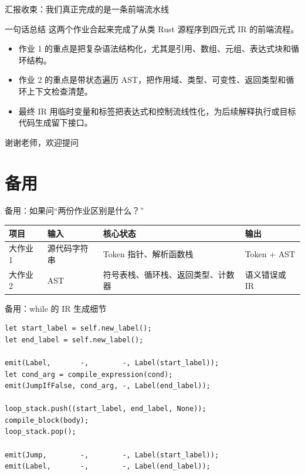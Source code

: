 \documentclass[aspectratio=169]{ctexbeamer}
\begin{document}
\begin{frame}{汇报收束：我们真正完成的是一条前端流水线}
    \begin{block}{一句话总结}
        这两个作业合起来完成了从类 Rust 源程序到四元式 IR 的前端流程。
    \end{block}
    \begin{itemize}
        \item 作业 1 的重点是把复杂语法结构化，尤其是引用、数组、元组、表达式块和循环结构。
        \item 作业 2 的重点是带状态遍历 AST，把作用域、类型、可变性、返回类型和循环上下文检查清楚。
        \item 最终 IR 用临时变量和标签把表达式和控制流线性化，为后续解释执行或目标代码生成留下接口。
    \end{itemize}
    \vfill
    \centering
    \Large 谢谢老师，欢迎提问
\end{frame}

\appendix
\section{备用}

\begin{frame}{备用：如果问“两份作业区别是什么？”}
    \begin{table}
    \centering
    \small
    \begin{tabular}{p{2.3cm}p{3.0cm}p{3.2cm}p{3.1cm}}
        \toprule
        \textbf{项目} & \textbf{输入} & \textbf{核心状态} & \textbf{输出} \\
        \midrule
        大作业 1 & 源代码字符串 & Token 指针、解析函数栈 & Token + AST \\
        大作业 2 & AST & 符号表栈、循环栈、返回类型、计数器 & 语义错误或 IR \\
        \bottomrule
    \end{tabular}
    \end{table}
\end{frame}

\begin{frame}[fragile]{备用：while 的 IR 生成细节}
    \begin{lstlisting}[style=tinycode]
let start_label = self.new_label();
let end_label = self.new_label();

emit(Label,       -,        -, Label(start_label));
let cond_arg = compile_expression(cond);
emit(JumpIfFalse, cond_arg, -, Label(end_label));

loop_stack.push((start_label, end_label, None));
compile_block(body);
loop_stack.pop();

emit(Jump,        -,        -, Label(start_label));
emit(Label,       -,        -, Label(end_label));
    \end{lstlisting}
\end{frame}
\end{document}
